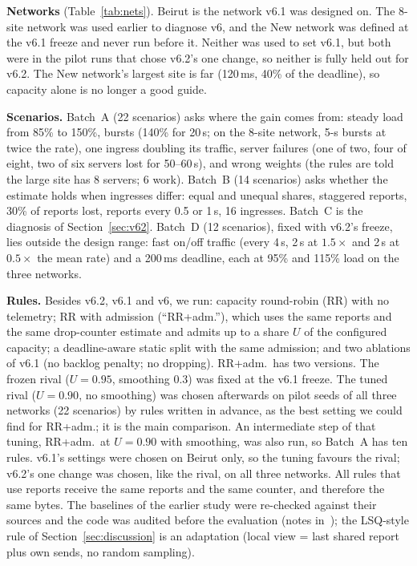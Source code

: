 \documentclass[conference]{IEEEtran}
\begin{document}
\textbf{Networks} (Table~\ref{tab:nets}). Beirut is the network v6.1 was designed on. The 8-site network was used earlier to diagnose v6, and the New network was defined at the v6.1 freeze and never run before it. Neither was used to set v6.1, but both were in the pilot runs that chose v6.2's one change, so neither is fully held out for v6.2. The New network's largest site is far (120\,ms, 40\% of the deadline), so capacity alone is no longer a good guide.

\textbf{Scenarios.} Batch~A (22 scenarios) asks where the gain comes from: steady load from 85\% to 150\%, bursts (140\% for 20\,s; on the 8-site network, 5-s bursts at twice the rate), one ingress doubling its traffic, server failures (one of two, four of eight, two of six servers lost for 50--60\,s), and wrong weights (the rules are told the large site has 8 servers; 6 work). Batch~B (14 scenarios) asks whether the estimate holds when ingresses differ: equal and unequal shares, staggered reports, 30\% of reports lost, reports every 0.5 or 1\,s, 16 ingresses. Batch~C is the diagnosis of Section~\ref{sec:v62}. Batch~D (12 scenarios), fixed with v6.2's freeze, lies outside the design range: fast on/off traffic (every 4\,s, 2\,s at $1.5\times$ and 2\,s at $0.5\times$ the mean rate) and a 200\,ms deadline, each at 95\% and 115\% load on the three networks.

\textbf{Rules.} Besides v6.2, v6.1 and v6, we run: capacity round-robin (RR) with no telemetry; RR with admission (``RR+adm.''), which uses the same reports and the same drop-counter estimate and admits up to a share $U$ of the configured capacity; a deadline-aware static split with the same admission; and two ablations of v6.1 (no backlog penalty; no dropping). RR+adm.\ has two versions. The frozen rival ($U = 0.95$, smoothing 0.3) was fixed at the v6.1 freeze. The tuned rival ($U = 0.90$, no smoothing) was chosen afterwards on pilot seeds of all three networks (22 scenarios) by rules written in advance, as the best setting we could find for RR+adm.; it is the main comparison. An intermediate step of that tuning, RR+adm.\ at $U = 0.90$ with smoothing, was also run, so Batch~A has ten rules. v6.1's settings were chosen on Beirut only, so the tuning favours the rival; v6.2's one change was chosen, like the rival, on all three networks. All rules that use reports receive the same reports and the same counter, and therefore the same bytes. The baselines of the earlier study were re-checked against their sources and the code was audited before the evaluation (notes in~\cite{repo}); the LSQ-style rule of Section~\ref{sec:discussion} is an adaptation (local view = last shared report plus own sends, no random sampling).
\end{document}
